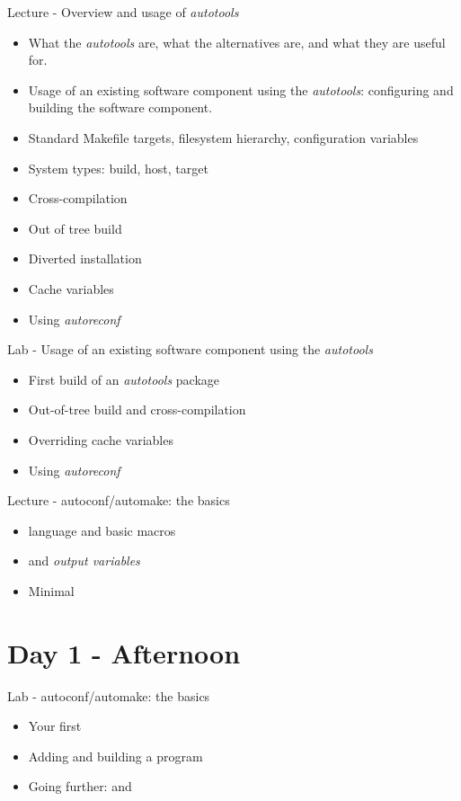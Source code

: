 \documentclass[a4paper,12pt,obeyspaces,spaces,hyphens]{article}
\begin{document}
\feagendatwocolumn
{Lecture - Overview and usage of {\em autotools}}
{
  \begin{itemize}
  \item What the {\em autotools} are, what the alternatives are, and
    what they are useful for.
  \item Usage of an existing software component using the {\em
      autotools}: configuring and building the software component.
  \item Standard Makefile targets, filesystem hierarchy, configuration variables
  \item System types: build, host, target
  \item Cross-compilation
  \item Out of tree build
  \item Diverted installation
  \item Cache variables
  \item Using {\em autoreconf}
  \end{itemize}
}
{Lab - Usage of an existing software component using the {\em autotools}}
{
  \begin{itemize}
  \item First build of an {\em autotools} package
  \item Out-of-tree build and cross-compilation
  \item Overriding cache variables
  \item Using {\em autoreconf}
  \end{itemize}
}

\feagendaonecolumn
{Lecture - autoconf/automake: the basics}
{
  \begin{itemize}
  \item {} language and basic macros
  \item {} and {\em output variables}
  \item Minimal 
  \end{itemize}
}

\section{Day 1 - Afternoon}

\feagendaonecolumn
{Lab - autoconf/automake: the basics}
{
  \begin{itemize}
  \item Your first 
  \item Adding and building a program
  \item Going further:  and 
  \end{itemize}
}
\end{document}
